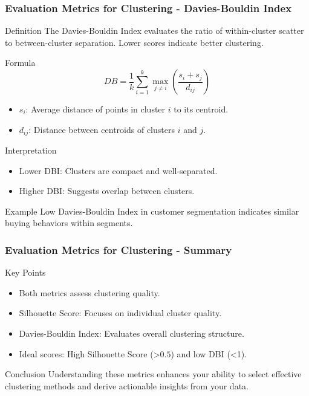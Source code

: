 \documentclass[aspectratio=169]{beamer}
\begin{document}
\begin{frame}[fragile]
    \frametitle{Evaluation Metrics for Clustering - Davies-Bouldin Index}
    \begin{block}{Definition}
        The Davies-Bouldin Index evaluates the ratio of within-cluster scatter to between-cluster separation. Lower scores indicate better clustering.
    \end{block}
    
    \begin{block}{Formula}
        \begin{equation}
        DB = \frac{1}{k} \sum_{i=1}^{k} \max_{j \neq i} \left( \frac{s_i + s_j}{d_{ij}} \right)
        \end{equation}
    \end{block}
    
    \begin{itemize}
        \item $s_i$: Average distance of points in cluster $i$ to its centroid.
        \item $d_{ij}$: Distance between centroids of clusters $i$ and $j$.
    \end{itemize}
    
    \begin{block}{Interpretation}
        \begin{itemize}
            \item Lower DBI: Clusters are compact and well-separated.
            \item Higher DBI: Suggests overlap between clusters.
        \end{itemize}
    \end{block}
    
    \begin{block}{Example}
        Low Davies-Bouldin Index in customer segmentation indicates similar buying behaviors within segments.
    \end{block}
\end{frame}

\begin{frame}[fragile]
    \frametitle{Evaluation Metrics for Clustering - Summary}
    \begin{block}{Key Points}
        \begin{itemize}
            \item Both metrics assess clustering quality.
            \item Silhouette Score: Focuses on individual cluster quality.
            \item Davies-Bouldin Index: Evaluates overall clustering structure.
            \item Ideal scores: High Silhouette Score (>$0.5$) and low DBI (<1).
        \end{itemize}
    \end{block}
    
    \begin{block}{Conclusion}
        Understanding these metrics enhances your ability to select effective clustering methods and derive actionable insights from your data.
    \end{block}
\end{frame}
\end{document}
